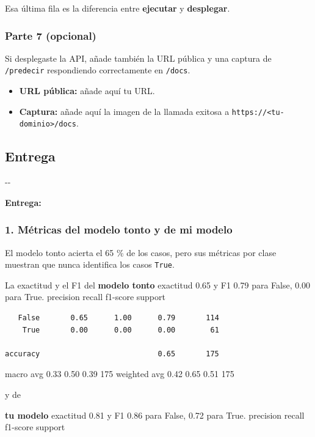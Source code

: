 \documentclass[
]{article}
\providecommand{\tightlist}{%
  \setlength{\itemsep}{0pt}\setlength{\parskip}{0pt}}
\begin{document}
Esa última fila es la diferencia entre \textbf{ejecutar} y
\textbf{desplegar}.

\subsubsection{Parte 7 (opcional)}\label{parte-7-opcional}

Si desplegaste la API, añade también la URL pública y una captura de
\texttt{/predecir} respondiendo correctamente en \texttt{/docs}.

\begin{itemize}
\tightlist
\item
  \textbf{URL pública:} añade aquí tu URL.
\item
  \textbf{Captura:} añade aquí la imagen de la llamada exitosa a
  \texttt{https://\textless{}tu-dominio\textgreater{}/docs}.
\end{itemize}

\protect{}\label{e0875f6c}
\subsection{Entrega}\label{entrega}

-\/-

\textbf{Entrega:}

\subsubsection{1. Métricas del modelo tonto y de mi
modelo}\label{1-muxe9tricas-del-modelo-tonto-y-de-mi-modelo}

El modelo tonto acierta el 65 \% de los casos, pero sus métricas por
clase muestran que nunca identifica los casos \texttt{True}.

La exactitud y el F1 del \textbf{modelo tonto} exactitud 0.65 y F1 0.79
para False, 0.00 para True. precision recall f1-score support

\begin{verbatim}
   False       0.65      1.00      0.79       114
    True       0.00      0.00      0.00        61

accuracy                           0.65       175
\end{verbatim}

macro avg 0.33 0.50 0.39 175 weighted avg 0.42 0.65 0.51 175

y de

\textbf{tu modelo} exactitud 0.81 y F1 0.86 para False, 0.72 para True.
precision recall f1-score support
\end{document}
